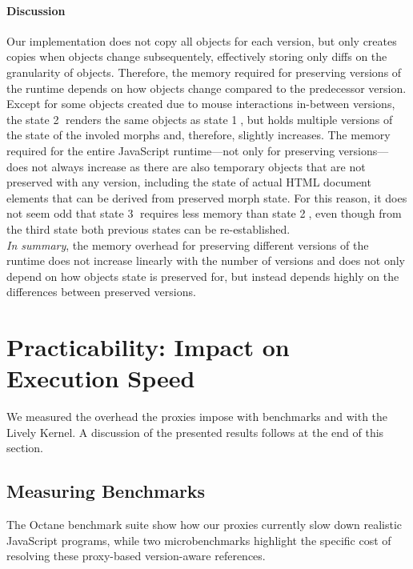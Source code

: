 \paragraph{Discussion}
Our implementation does not copy all objects for each version, but only creates copies when objects change subsequentely, effectively storing only diffs on the granularity of objects.
Therefore, the memory required for preserving versions of the runtime depends on how objects change compared to the predecessor version.
Except for some objects created due to mouse interactions in-between versions, the state \textcircled{2} renders the same objects as state \textcircled{1}, but holds multiple versions of the state of the involed morphs and, therefore, slightly increases.
The memory required for the entire JavaScript runtime---not only for preserving versions---does not always increase as there are also temporary objects that are not preserved with any version, including the state of actual HTML document elements that can be derived from preserved morph state.
For this reason, it does not seem odd that state \textcircled{3} requires less memory than state \textcircled{2}, even though from the third state both previous states can be re-established.\\
\emph{In summary}, the memory overhead for preserving different versions of the runtime does not increase linearly with the number of versions and does not only depend on how objects state is preserved for, but instead depends highly on the differences between preserved versions.



\section{Practicability: Impact on Execution Speed} \label{sec:DISCUSSION:3}

We measured the overhead the proxies impose with benchmarks and with the Lively Kernel.
A discussion of the presented results follows at the end of this section.


\subsection{Measuring Benchmarks}

The Octane benchmark suite show how our proxies currently slow down realistic JavaScript programs, while two microbenchmarks highlight the specific cost of resolving these proxy-based version-aware references.

